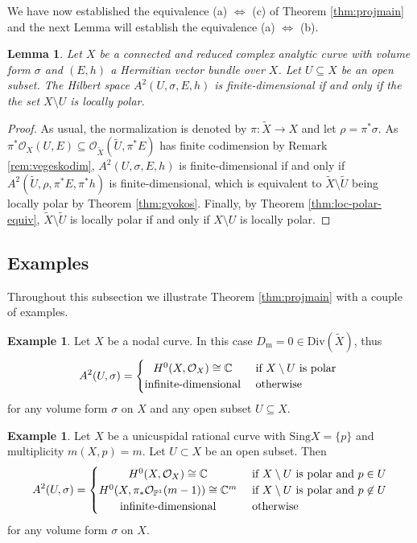 \documentclass[11pt]{amsart}
\newtheorem{lemma}[theorem]{Lemma}
\theoremstyle{definition}
\newtheorem{example}[theorem]{Example}
\newcommand{\bC}{{\mathbb C}}
\begin{document}
   

We have now established the equivalence (a) $\Longleftrightarrow$ (c) of Theorem \ref{thm:projmain} and the next Lemma will establish the equivalence (a) $\Longleftrightarrow$ (b).


\begin{lemma}
    Let $X$ be a connected and reduced complex analytic curve with volume form $\sigma$ and $(E,h)$ a Hermitian vector bundle over $X$. Let $U \subseteq X$ be an open subset. The Hilbert space $A^2(U,\sigma,E,h)$ is finite-dimensional if and only if the the set $X \setminus U$ is locally polar.
\end{lemma}

\begin{proof}
    As usual, the normalization is denoted by $\pi : \widetilde{X} \to X$ and let $\rho = \pi^*\sigma$. As $\pi^*\mathcal{O}_X(U,E) \subseteq \mathcal{O}_{\widetilde{X}}(\widetilde{U},\pi^*E)$ has finite codimension by Remark \ref{rem:vegeskodim}, $A^2(U,\sigma,E,h)$ is finite-dimensional if and only if $A^2(\widetilde{U},\rho,\pi^*E,\pi^*h)$ is finite-dimensional, which is equivalent to $\widetilde{X}\setminus \widetilde{U}$ being locally polar by Theorem \ref{thm:gyokos}. Finally, by Theorem \ref{thm:loc-polar-equiv}, $\widetilde{X}\setminus \widetilde{U}$ is locally polar if and only if $X \setminus U$ is locally polar.
\end{proof}

\subsection{Examples}\label{section:dimension}

Throughout this subsection we illustrate Theorem \ref{thm:projmain} with a couple of examples.

\begin{example}
    Let $X$ be a nodal curve. In this case $D_\text{m} = 0 \in \text{Div}(\widetilde{X})$, thus
    $$A^2(U,\sigma) = \begin{cases}
        \hfil H^0(X,\mathcal{O}_X) \cong \bC & \text{ if } X \setminus U \text{ is polar }\\
        \text{infinite-dimensional} & \text{ otherwise}
        \end{cases}$$
        for any volume form $\sigma$ on $X$ and any open subset $U \subseteq X$.
\end{example}

\begin{example}
    Let $X$ be a unicuspidal rational curve with  $\text{Sing}X = \{p\}$ and multiplicity $m(X,p) = m$. Let $U \subset X$ be an open subset. Then
    $$A^2(U,\sigma) = \begin{cases}
        \hfil H^0(X,\mathcal{O}_X) \cong \bC & \text{ if } X \setminus U \text{ is polar and } p \in U \\
        H^0(X, \pi_*\mathcal{O}_{\mathbb{P}^1}(m-1)) \cong \bC^m & \text{ if } X \setminus U \text{ is polar and } p \not\in U \\
        \hfil \text{infinite-dimensional} & \text{ otherwise}
    \end{cases}$$
    for any volume form $\sigma$ on $X$.
\end{example}
\end{document}

